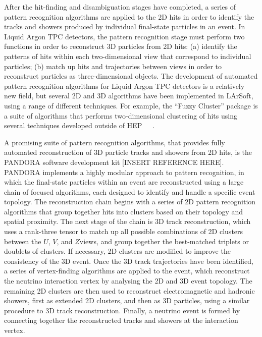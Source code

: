 After the hit-finding and disambiguation stages have completed, a series of 
pattern recognition algorithms are applied to the 2D hits in order to identify 
the tracks and showers produced by individual final-state particles in an event.
In Liquid Argon TPC detectors, the pattern recognition stage must perform 
two functions in order to reconstruct 3D particles from 2D hits:
(a) identify the patterns of hits within each two-dimensional view
that correspond to individual particles; (b) match up hits and trajectories
between views in order to reconstruct particles as three-dimensional objects.
The development of automated pattern recognition algorithms for Liquid Argon 
TPC detectors is a relatively new field, but several 2D and 3D algorithms
have been implemented in LArSoft, using a range of different techniques.
For example, the ``Fuzzy Cluster'' package is a suite of algorithms that
performs two-dimensional clustering of hits using several techniques developed 
outside of HEP~\cite{flame}~\cite{ppht}~\cite{dbscan}.

A promising suite of pattern recognition algorithms, that provides fully 
automated reconstruction of 3D particle tracks and showers from 2D hits, 
is the PANDORA software development kit [INSERT REFERENCE HERE].
PANDORA implements a highly modular approach to pattern recognition,
in which the final-state particles within an event are reconstructed using 
a large chain of focused algorithms, each designed to identify and handle
a specific event topology. The reconstruction chain begins with a 
series of 2D pattern recognition algorithms that group together hits 
into clusters based on their topology and spatial proximity.
The next stage of the chain is 3D track reconstruction, 
which uses a rank-three tensor to match up all possible combinations 
of 2D clusters between the $U$, $V$, and $Z$views, and group together 
the best-matched triplets or doublets of clusters. If necessary, 
2D clusters are modified to improve the consistency of the 3D event. 
Once the 3D track trajectories have been identified, 
a series of vertex-finding algorithms are applied to the event,
which reconstruct the neutrino interaction vertex by analysing 
the 2D and 3D event topology. The remaining 2D clusters are then
used to reconstruct electromagnetic and hadronic showers,
first as extended 2D clusters, and then as 3D particles, 
using a similar procedure to 3D track reconstruction.
Finally, a neutrino event is formed by connecting together the 
reconstructed tracks and showers at the interaction vertex.

